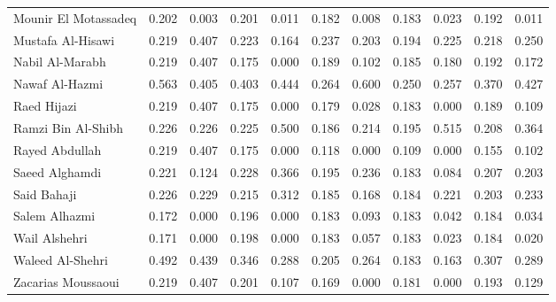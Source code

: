 \begin{subappendices}
\begin{table}
\begin{center}
\begin{tabular}{l cc cccccccc}
Mounir El Motassadeq   & 0.202     & 0.003       & 0.201     & 0.011       & 0.182     & 0.008        & 0.183     & 0.023       & 0.192            & 0.011            \\
Mustafa Al-Hisawi      & 0.219     & 0.407       & 0.223     & 0.164       & 0.237     & 0.203        & 0.194     & 0.225       & 0.218            & 0.250            \\
Nabil Al-Marabh        & 0.219     & 0.407       & 0.175     & 0.000       & 0.189     & 0.102        & 0.185     & 0.180       & 0.192            & 0.172            \\
Nawaf Al-Hazmi         & 0.563     & 0.405       & 0.403     & 0.444       & 0.264     & 0.600        & 0.250     & 0.257       & 0.370            & 0.427            \\
Raed Hijazi            & 0.219     & 0.407       & 0.175     & 0.000       & 0.179     & 0.028        & 0.183     & 0.000       & 0.189            & 0.109            \\
Ramzi Bin Al-Shibh     & 0.226     & 0.226       & 0.225     & 0.500       & 0.186     & 0.214        & 0.195     & 0.515       & 0.208            & 0.364            \\
Rayed Abdullah         & 0.219     & 0.407       & 0.175     & 0.000       & 0.118     & 0.000        & 0.109     & 0.000       & 0.155            & 0.102            \\
Saeed Alghamdi         & 0.221     & 0.124       & 0.228     & 0.366       & 0.195     & 0.236        & 0.183     & 0.084       & 0.207            & 0.203            \\
Said Bahaji            & 0.226     & 0.229       & 0.215     & 0.312       & 0.185     & 0.168        & 0.184     & 0.221       & 0.203            & 0.233            \\
Salem Alhazmi          & 0.172     & 0.000       & 0.196     & 0.000       & 0.183     & 0.093        & 0.183     & 0.042       & 0.184            & 0.034            \\
Wail Alshehri          & 0.171     & 0.000       & 0.198     & 0.000       & 0.183     & 0.057        & 0.183     & 0.023       & 0.184            & 0.020            \\
Waleed Al-Shehri       & 0.492     & 0.439       & 0.346     & 0.288       & 0.205     & 0.264        & 0.183     & 0.163       & 0.307            & 0.289            \\
Zacarias Moussaoui     & 0.219     & 0.407       & 0.201     & 0.107       & 0.169     & 0.000        & 0.181     & 0.000       & 0.193            & 0.129            \\

\end{tabular}
\end{center}
\end{table}
\end{subappendices}
